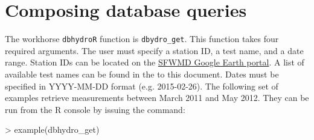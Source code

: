 \documentclass[12pt,notitlepage]{article}
\begin{document}
\section{Composing database queries}

The workhorse \texttt{dbhydroR} function is \verb|dbydro_get|. This function takes four required arguments. The user must specify a station ID, a test name, and a date range. Station IDs can be located on the \href{http://my.sfwmd.gov/KMLEXT/CUSTOMKMLS/DBHydro/DBHydroKML/DBHYDRO_KML.kmz}{SFWMD Google Earth portal}. A list of available test names can be found in the  to this document. Dates must be specified in YYYY-MM-DD format (e.g. 2015-02-26).   The following set of examples retrieve measurements between March 2011 and May 2012. They can be run from the R console by issuing the command:

\begin{Schunk}
\begin{Sinput}
> example(dbhydro_get)
\end{Sinput}
\end{Schunk}
\end{document}
